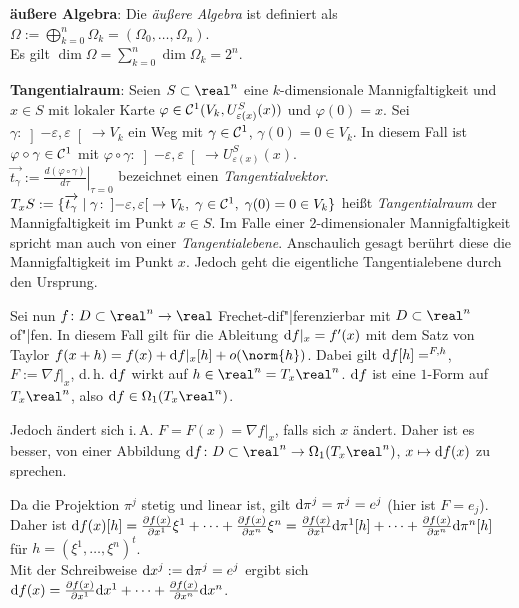 \textbf{äußere Algebra}:
Die \emph{äußere Algebra} ist definiert als
$\Omega := \bigoplus_{k=0}^n \Omega_k = (\Omega_0, \dotsc, \Omega_n)$. \\
Es gilt $\dim \Omega = \sum_{k=0}^n \dim \Omega_k = 2^n$.

\linie

\textbf{Tangentialraum}:
Seien $S \subset \real^n$ eine $k$-dimensionale Mannigfaltigkeit und $x \in S$
mit lokaler Karte $\varphi \in \mathcal{C}^1(V_k, U_{\varepsilon(x)}^S(x))$
und $\varphi(0) = x$.
Sei $\gamma\colon \left]-\varepsilon, \varepsilon\right[ \rightarrow V_k$
ein Weg mit $\gamma \in \mathcal{C}^1$, $\gamma(0) = 0 \in V_k$.
In diesem Fall ist $\varphi \circ \gamma \in \mathcal{C}^1$ mit
$\varphi \circ \gamma\colon \left]-\varepsilon, \varepsilon\right[
\rightarrow U_{\varepsilon(x)}^S(x)$. \\
$\overrightarrow{t_\gamma} :=
\left.\frac{d(\varphi \circ \gamma)}{d\tau}\right|_{\tau=0}$
bezeichnet einen \emph{Tangentialvektor}. \\
$T_x S := \{\overrightarrow{t_\gamma} \;|\;
\gamma\colon \left]-\varepsilon, \varepsilon\right[ \rightarrow V_k,\;
\gamma \in \mathcal{C}^1,\; \gamma(0) = 0 \in V_k\}$ heißt
\emph{Tangentialraum} der Mannigfaltigkeit im Punkt $x \in S$.
Im Falle einer $2$-dimensionaler Mannigfaltigkeit spricht man auch von einer
\emph{Tangentialebene}.
Anschaulich gesagt berührt diese die Mannigfaltigkeit im Punkt $x$.
Jedoch geht die eigentliche Tangentialebene durch den Ursprung.

\linie
\pagebreak

Sei nun $f\colon D \subset \real^n \rightarrow \real$
Frechet-dif"|ferenzierbar mit $D \subset \real^n$ of"|fen.
In diesem Fall gilt für die Ableitung $\mathrm{d} f|_x = f'(x)$ mit dem Satz von Taylor
$f(x + h) = f(x) + \d f|_x[h] + o(\norm{h})$.
Dabei gilt $\mathrm{d} f[h] = \sp{F, h}$, $F := \nabla f|_x$, d.\,h.
$\mathrm{d} f$ wirkt auf $h \in \real^n = T_x \real^n$.
$\mathrm{d} f$ ist eine $1$-Form auf $T_x \real^n$, also
$\d f \in \Omega_1(T_x \real^n)$.

Jedoch ändert sich i.\,A. $F = F(x) = \nabla f|_x$, falls sich $x$ ändert.
Daher ist es besser, von einer Abbildung
$\d f\colon
D \subset \real^n \rightarrow \Omega_1(T_x \real^n)$, $x \mapsto \mathrm{d} f(x)$
zu sprechen.

Da die Projektion $\pi^j$ stetig und linear ist, gilt $\mathrm{d} \pi^j = \pi^j = e^j$
(hier ist $F = e_j$).
Daher ist $\mathrm{d} f(x)[h] = \frac{\partial f(x)}{\partial x^1} \xi^1 + \dotsb +
\frac{\partial f(x)}{\partial x^n} \xi^n =
\frac{\partial f(x)}{\partial x^1} \mathrm{d} \pi^1[h] + \dotsb +
\frac{\partial f(x)}{\partial x^n} \mathrm{d} \pi^n[h]$ für
$h = (\xi^1, \dotsc, \xi^n)^t$. \\
Mit der Schreibweise $\mathrm{d} x^j := \mathrm{d} \pi^j = e^j$ ergibt sich
$\mathrm{d} f(x) = \frac{\partial f(x)}{\partial x^1} \mathrm{d} x^1 + \dotsb +
\frac{\partial f(x)}{\partial x^n} \mathrm{d} x^n$.

